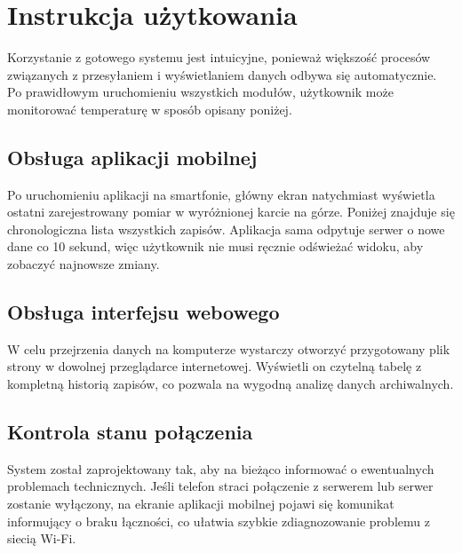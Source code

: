 \pagebreak

\section{Instrukcja użytkowania}
Korzystanie z gotowego systemu jest intuicyjne, ponieważ większość procesów związanych z przesyłaniem i wyświetlaniem danych odbywa się automatycznie. Po prawidłowym uruchomieniu wszystkich modułów, użytkownik może monitorować temperaturę w sposób opisany poniżej.

\subsection{Obsługa aplikacji mobilnej}
Po uruchomieniu aplikacji na smartfonie, główny ekran natychmiast wyświetla ostatni zarejestrowany pomiar w wyróżnionej karcie na górze. Poniżej znajduje się chronologiczna lista wszystkich zapisów. Aplikacja sama odpytuje serwer o nowe dane co 10 sekund, więc użytkownik nie musi ręcznie odświeżać widoku, aby zobaczyć najnowsze zmiany.

\subsection{Obsługa interfejsu webowego}
W celu przejrzenia danych na komputerze wystarczy otworzyć przygotowany plik strony w dowolnej przeglądarce internetowej. Wyświetli on czytelną tabelę z kompletną historią zapisów, co pozwala na wygodną analizę danych archiwalnych.

\subsection{Kontrola stanu połączenia}
System został zaprojektowany tak, aby na bieżąco informować o ewentualnych problemach technicznych. Jeśli telefon straci połączenie z serwerem lub serwer zostanie wyłączony, na ekranie aplikacji mobilnej pojawi się komunikat informujący o braku łączności, co ułatwia szybkie zdiagnozowanie problemu z siecią Wi-Fi.